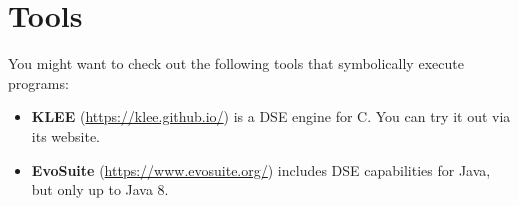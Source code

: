 \section{Tools}

You might want to check out the following tools that symbolically execute
programs:

\begin{itemize}

    \item {\bf KLEE} (\url{https://klee.github.io/}) is a DSE engine for C. You
can try it out via its website.

    \item {\bf EvoSuite} (\url{https://www.evosuite.org/}) includes DSE
capabilities for Java, but only up to Java 8.

\end{itemize}

